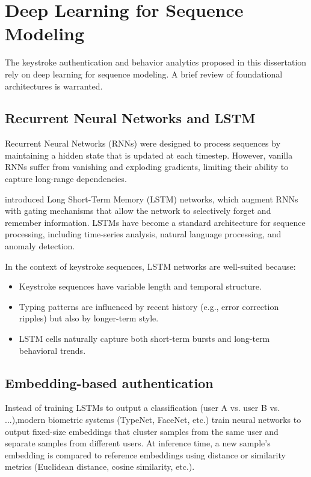 \section{Deep Learning for Sequence Modeling}
\label{sec:deep-learning}

The keystroke authentication and behavior analytics proposed in this dissertation rely on deep learning for sequence modeling. A brief review of foundational architectures is warranted.

\subsection{Recurrent Neural Networks and LSTM}

Recurrent Neural Networks (RNNs) were designed to process sequences by maintaining a hidden state that is updated at each timestep. However, vanilla RNNs suffer from vanishing and exploding gradients, limiting their ability to capture long-range dependencies.

\citet{hochreiter1997lstm} introduced Long Short-Term Memory (LSTM) networks, which augment RNNs with gating mechanisms that allow the network to selectively forget and remember information. LSTMs have become a standard architecture for sequence processing, including time-series analysis, natural language processing, and anomaly detection.

In the context of keystroke sequences, LSTM networks are well-suited because:
\begin{itemize}
  \item Keystroke sequences have variable length and temporal structure.
  \item Typing patterns are influenced by recent history (e.g., error correction ripples) but also by longer-term style.
  \item LSTM cells naturally capture both short-term bursts and long-term behavioral trends.
\end{itemize}

\subsection{Embedding-based authentication}

Instead of training LSTMs to output a classification (user A vs. user B vs. ...),modern biometric systems (TypeNet, FaceNet, etc.) train neural networks to output fixed-size embeddings that cluster samples from the same user and separate samples from different users. At inference time, a new sample's embedding is compared to reference embeddings using distance or similarity metrics (Euclidean distance, cosine similarity, etc.).

